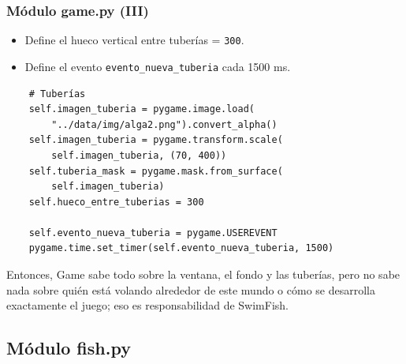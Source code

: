 \documentclass[
	11pt, %
]{beamer}
\begin{document}

\begin{frame}[fragile]
\frametitle{Módulo game.py (III)}

\begin{itemize}\setlength{\itemsep}{2pt}
    \item Define el hueco vertical entre tuberías = \texttt{300}.
    \item Define el evento \texttt{evento\_nueva\_tuberia} cada 1500 ms.
\end{itemize}

{\scriptsize
\begin{verbatim}
    # Tuberías
    self.imagen_tuberia = pygame.image.load(
        "../data/img/alga2.png").convert_alpha()
    self.imagen_tuberia = pygame.transform.scale(
        self.imagen_tuberia, (70, 400))
    self.tuberia_mask = pygame.mask.from_surface(
        self.imagen_tuberia)
    self.hueco_entre_tuberias = 300

    self.evento_nueva_tuberia = pygame.USEREVENT
    pygame.time.set_timer(self.evento_nueva_tuberia, 1500)
\end{verbatim}
}

Entonces, Game sabe todo sobre la ventana, el fondo y las tuberías,
pero no sabe nada sobre quién está volando alrededor de este mundo o cómo se desarrolla exactamente el juego;
eso es responsabilidad de SwimFish.

\end{frame}


\subsection{Módulo fish.py}
\end{document}
